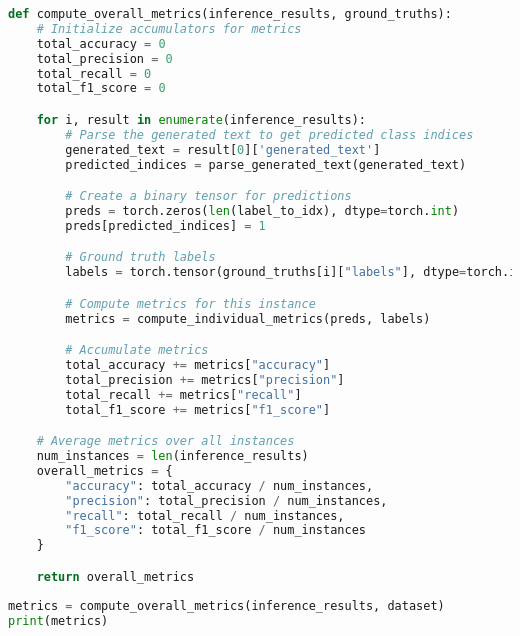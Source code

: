\begin{latin}
	\begin{lstlisting}[language=Python, title=\rl{تابع بدست آوردن ارزیابی مدل به ازای تمام نمونه ها}]
def compute_overall_metrics(inference_results, ground_truths):
    # Initialize accumulators for metrics
    total_accuracy = 0
    total_precision = 0
    total_recall = 0
    total_f1_score = 0

    for i, result in enumerate(inference_results):
        # Parse the generated text to get predicted class indices
        generated_text = result[0]['generated_text']
        predicted_indices = parse_generated_text(generated_text)

        # Create a binary tensor for predictions
        preds = torch.zeros(len(label_to_idx), dtype=torch.int)
        preds[predicted_indices] = 1

        # Ground truth labels
        labels = torch.tensor(ground_truths[i]["labels"], dtype=torch.int)

        # Compute metrics for this instance
        metrics = compute_individual_metrics(preds, labels)

        # Accumulate metrics
        total_accuracy += metrics["accuracy"]
        total_precision += metrics["precision"]
        total_recall += metrics["recall"]
        total_f1_score += metrics["f1_score"]

    # Average metrics over all instances
    num_instances = len(inference_results)
    overall_metrics = {
        "accuracy": total_accuracy / num_instances,
        "precision": total_precision / num_instances,
        "recall": total_recall / num_instances,
        "f1_score": total_f1_score / num_instances
    }

    return overall_metrics

\end{lstlisting}
\end{latin}


\begin{latin}
	\begin{lstlisting}[language=Python, title=\rl{ارزبابی خروجی های مدل}]
metrics = compute_overall_metrics(inference_results, dataset)
print(metrics) 
\end{lstlisting}
\end{latin}
\clearpage